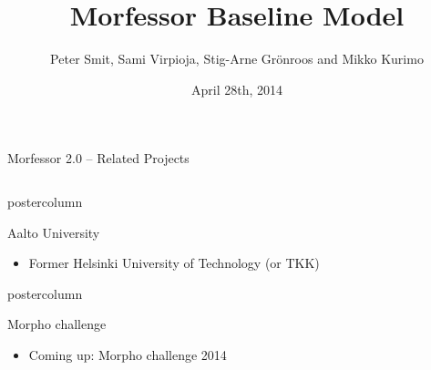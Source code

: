 \documentclass[final]{beamer} %
\title[Morfessor Model]{Morfessor Baseline Model}
\author[Smit et. al]{Peter Smit, Sami Virpioja, Stig-Arne Grönroos and Mikko Kurimo}
\institute[Aalto University]{Aalto University}
\date{April 28th, 2014}
\begin{document}
  \begin{frame}{Morfessor 2.0 -- Related Projects} 
\begin{columns}



\begin{column}{.49\textwidth}
  \begin{beamercolorbox}[center,wd=\textwidth]{postercolumn}
 \begin{block}{Aalto University}
              \begin{itemize}
              \item Former Helsinki University of Technology (or TKK)

              \end{itemize}              
            \end{block}
            
	\end{beamercolorbox}
\vfill
  \begin{beamercolorbox}[center,wd=\textwidth]{postercolumn}
 \begin{block}{Morpho challenge}
              \begin{itemize}
		\item Coming up: Morpho challenge 2014
              \end{itemize}              
            \end{block}
            

\end{beamercolorbox}
\end{column}
\end{columns}
\end{frame}
\end{document}
